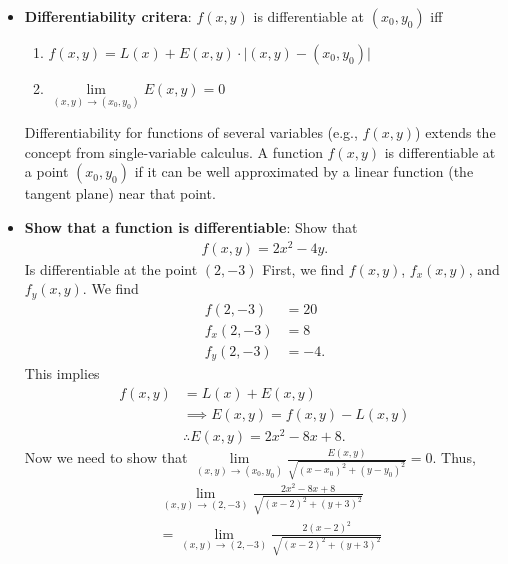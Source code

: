 \documentclass{report}
\begin{document}
\begin{itemize}
            \item \textbf{Differentiability critera}: $f(x,y)$ is differentiable at $(x_{0}, y_{0})$ iff 
                \begin{enumerate}
                    \item $f(x,y) = L(x) + E(x,y) \cdot \bigg\lvert (x,y) - (x_{0}, y_{0}) \bigg\rvert $
                    \item $\lim\limits_{(x,y) \to (x_{0}, y_{0})}{E(x,y)}  =0 $
                \end{enumerate}
                \bigbreak \noindent 
                \textbf{}
                Differentiability for functions of several variables (e.g., $f(x,y)$) extends the concept from single-variable calculus. A function  $f(x,y)$ is differentiable at a point $(x_{0}, y_{0})$ if it can be well approximated by a linear function (the tangent plane) near that point.
            \item \textbf{Show that a function is differentiable}: Show that 
                \begin{align*}
                    f(x,y) = 2x^{2} - 4y
                .\end{align*}
                Is differentiable at the point $(2,-3)$
                \bigbreak \noindent 
                First, we find $f(x,y)$, $f_{x}(x,y)$, and $f_{y}(x,y)$. We find
                \begin{align*}
                    f(2,-3) &= 20 \\
                    f_{x}(2,-3) &= 8 \\
                    f_{y}(2,-3) &= -4
                .\end{align*}
                \bigbreak \noindent 
                This implies
                \begin{align*}
                    f(x,y) &= L(x) + E(x,y) \\
                           &\implies E(x,y) = f(x,y) - L(x,y) \\
                           &\therefore E(x,y) = 2x^{2} -8x+8
                .\end{align*}
                \bigbreak \noindent 
            Now we need to show that $\lim\limits_{(x,y) \to (x_{0}, y_{0})}{\frac{E(x,y)}{\sqrt{(x-x_{0})^{2}+(y-y_{0})^{2}}}} =0$. Thus,
            \begin{align*}
            &\lim\limits_{(x,y) \to (2,-3)}{\frac{2x^{2}-8x+8}{\sqrt{(x-2)^{2}+(y+3)^{2}}}}  \\
            &=\lim\limits_{(x,y) \to (2,-3)}{\frac{2(x-2)^{2}}{\sqrt{(x-2)^{2}+(y+3)^{2}}}}  \\ 

\end{align*}
\end{itemize}
\end{document}
